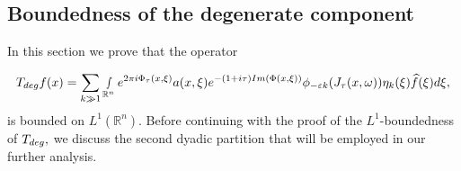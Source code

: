 \documentclass[12pt, reqno]{amsart}
\theoremstyle{definition}
\theoremstyle{remark}
\numberwithin{equation}{section}
\begin{document}
\subsection{Boundedness of the degenerate component}\label{Boundedness of the degenerate component}
In this section we prove that the  operator 

\begin{equation}\label{deg:section:l1}
    T_{\textnormal{deg}} f(x)= \sum_{k\gg 1}\smallint\limits_{\mathbb{R}^n}e^{2\pi i\Phi_\tau(x,\xi)}a(x,\xi)e^{-(1+i\tau)\textnormal{Im}(\Phi(x,\xi))}\phi_{-\varepsilon k}(J_{\tau}(x,\omega))\eta_{k}(\xi)\widehat{f}(\xi)d\xi,
\end{equation} is bounded on $L^1(\mathbb{R}^n).$ 
Before continuing with the proof of the $L^1$-boundedness of $T_{\textnormal{deg}} ,$ we discuss the second dyadic partition that will be employed in our further analysis.
\end{document}
